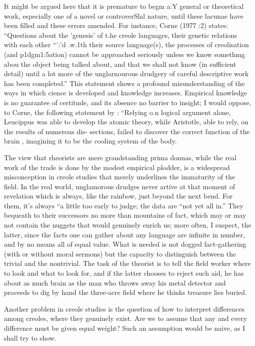 It might be argued here that it is premature to begm a:{\textquotedbl}Y general or theoretical work, especially one of a novel or controverSlal nature, until these lacunae have been filled and these errors amended. For instance, Corne (1977 :2) states: ``Questions about the 'genesis' of t.he creole languages, their genetic relations with each other ``':'d .w.1th their source language(s), the processes of creolisation (and p1dgm1:5a\-tion) cannot be approached seriously unless we know somethmg abou the object being talked about, and that we shall not know (in sufficient detail) until a lot more of the unglarnourous drudgery of careful descriptive work has been completed.'' This statement shows a profound misunderstanding of the ways in which cience is developed and knowledge increases. Empirical knowledge is no guarantee of certitude, and its absence no barrier to insight; I would oppose, to Corne, the following statement by \citet[3]{Dingwall1979}: ``Relying o.n logical argument alone, Leucippus was able to develop the atomic theory, while Aristotle, able to rely, on the results of numerous dis-
sections, failed to discover the correct function of the brain , imagining it to be the cooling system of the body.{\textquotedbl}

The view that rheorists are mere grandstanding prima donnas, while the real work of the trade is done by the modest empirical plodder, is a widespread misconception in creole studies that merely underlines the immaturity of the field. In the real world, unglamorous drudges never artive at that moment of revelation which is always, like the rainbow, just beyond the next bend. For them, it's always ``a little too early to judge{\textquotedbl}; the data are ``not yet all in.'' They bequeath to their successors no more than mountains of fact, which may or may not contain the nuggets that would genuinely enrich us; more often, I suspect, the latter, since the facts one can gather about any language are infinite in number, and by no means all of equal value. What is needed is not dogged fact-gathering (with or without moral sermons) but the capacity to distinguish between the trivial and the nontrivial. The task of the theorist is to tell the field worker where to look and what to look for, and if the latter chooses to reject such aid, he has about as much brain as the man who throws away his metal detector and proceeds to dig by hand the three-acre field where he thinks treasure lies buried.

Another problem in creole studies is the question of how to interpret differences among creoles, where they genuinely exist. Are we to assume that any and every difference must be given equal weight? Such an assumption would be naive, as I shall try to show.


